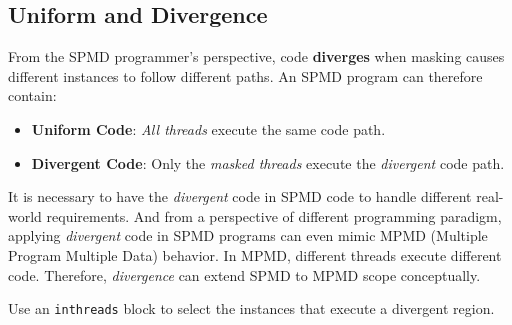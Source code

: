 \subsection*{Uniform and Divergence}

From the SPMD programmer's perspective, code \textbf{diverges} when masking causes different instances to follow different paths. An SPMD program can therefore contain:

\begin{itemize}[leftmargin=1.6em]
\item \textbf{Uniform Code}: \emph{All threads} execute the same code path.
\item \textbf{Divergent Code}: Only the \emph{masked threads} execute the \emph{divergent} code path.
\end{itemize}

It is necessary to have the \emph{divergent} code in SPMD code to handle different real-world requirements. And from a perspective of different programming paradigm, applying \emph{divergent} code in SPMD programs can even mimic MPMD (Multiple Program Multiple Data) behavior. In MPMD, different threads execute different code. Therefore, \emph{divergence} can extend SPMD to MPMD scope conceptually.

Use an \texttt{inthreads} block to select the instances that execute a divergent region.
